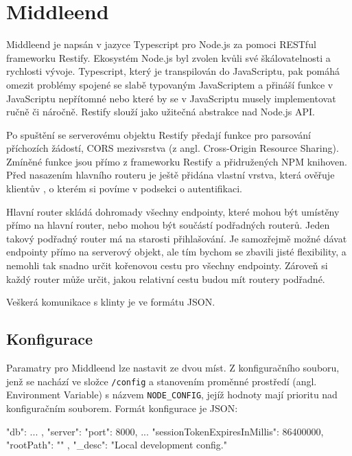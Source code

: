\chapter{Middleend} \label{middleend}


Middleend je napsán v jazyce Typescript pro Node.js za pomoci
RESTful frameworku Restify.
Ekosystém Node.js byl zvolen kvůli své škálovatelnosti a
rychlosti vývoje. Typescript, který je transpilován do JavaScriptu,
pak pomáhá omezit problémy spojené se slabě typovaným JavaScriptem
a přináší funkce v JavaScriptu nepřítomné nebo které by se
v JavaScriptu musely implementovat ručně či náročně.
Restify slouží jako užitečná abstrakce nad Node.js API.

Po spuštění se serverovému objektu Restify předají funkce pro parsování
příchozích žádostí, CORS mezivsrstva (z angl. Cross-Origin Resource Sharing).
Zmíněné funkce jsou přímo z frameworku Restify a přidružených NPM knihoven.
Před nasazením hlavního routeru je ještě přidána vlastní vrstva, která ověřuje
klientův , o kterém si povíme v podsekci o autentifikaci.

Hlavní router skládá dohromady všechny endpointy, které mohou být umístěny
přímo na hlavní router, nebo mohou být součástí podřadných routerů.
Jeden takový podřadný router má na starosti přihlašování.
Je samozřejmě možné dávat endpointy přímo na serverový objekt,
ale tím bychom se zbavili jisté flexibility, a nemohli tak snadno
určit kořenovou cestu pro všechny endpointy.
Zároveň si každý router může určit, jakou relativní cestu budou mít
routery podřadné.

Veškerá komunikace s klinty je ve formátu JSON.

\section{Konfigurace}

Paramatry pro Middleend lze nastavit ze dvou míst. Z konfiguračního souboru,
jenž se nachází ve složce \verb|/config| a stanovením proměnné prostředí
(angl. Environment Variable) s názvem \verb|NODE_CONFIG|, jejíž hodnoty
mají prioritu nad konfiguračním souborem. Formát konfigurace je JSON:

\begin{code}
{
    "db": {
        ...
    },
    "server": {
        "port": 8000,
        ...
        "sessionTokenExpiresInMillis": 86400000,
        "rootPath": ""
    },
    "_desc": "Local development config."
}
\end{code}

